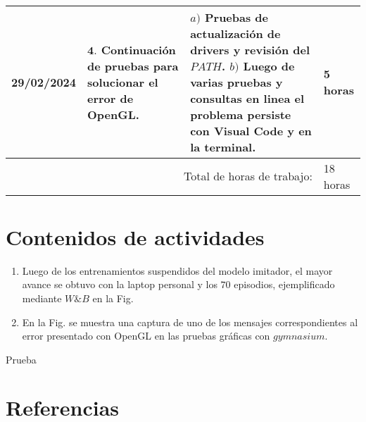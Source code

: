 \documentclass[12pt]{article}
\begin{document}
\hfill\\
\begin{minipage}[h]{\textwidth}
	\centering
	\begin{tabularx}{\textwidth}{|p{2cm}|X|X|p{2cm}|} 
		\hline		
		
	 	29/02/2024 & 
	 	$\mathbf{4}.$ Continuación de pruebas para solucionar el error de OpenGL. & 
	 	$a)$ Pruebas de actualización de drivers y revisión del $PATH$. \newline
	 	$b)$ Luego de varias pruebas y consultas en linea el problema persiste con Visual Code y en la terminal. \newline  & 
	 	5 horas \\
	 	
	 	\hline
		\multicolumn{3}{|r|}{Total de horas de trabajo:} & 18 horas \\ 
	 	\hline                 
	\end{tabularx}
\end{minipage}




\section*{Contenidos de actividades}

\begin{enumerate}
	\item Luego de los entrenamientos suspendidos del modelo imitador, el mayor avance se obtuvo con la laptop personal y los $70$ episodios, ejemplificado mediante $W\& B$ en la Fig.



	\item En la Fig.  se muestra una captura de uno de los mensajes correspondientes al error presentado con OpenGL en las pruebas gráficas con $gymnasium$.


\end{enumerate}


Prueba






\newpage

\section*{Referencias}
\renewcommand\refname{}


\end{document}
